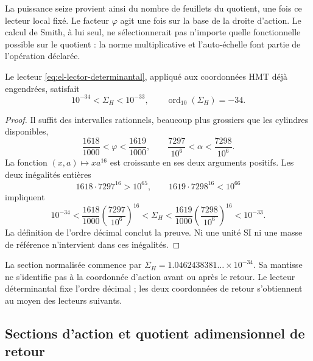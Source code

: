 La puissance seize provient ainsi du nombre de feuillets du quotient, une
fois ce lecteur local fixé. Le facteur \(\varphi\) agit une fois sur
la base de la droite d'action. Le calcul de Smith, à lui seul, ne
sélectionnerait pas n'importe quelle fonctionnelle possible sur le quotient : la norme
multiplicative et l'auto-échelle font partie de l'opération déclarée.

\begin{theorem}
Le lecteur \eqref{eq:el-lector-determinantal}, appliqué aux coordonnées
HMT déjà engendrées, satisfait
\begin{equation}
 10^{-34}<\Sigma_H<10^{-33},\qquad
 \operatorname{ord}_{10}(\Sigma_H)=-34.
 \label{eq:el-decada}
\end{equation}
\end{theorem}
\begin{proof}
\label{md:accion:intervalos}Il suffit des intervalles rationnels, beaucoup plus grossiers que les cylindres
disponibles,
\[
 \frac{1618}{1000}<\varphi<\frac{1619}{1000},\qquad
 \frac{7297}{10^6}<\alpha<\frac{7298}{10^6}.
\]
La fonction \((x,a)\mapsto xa^{16}\) est croissante en ses deux arguments
positifs. Les deux inégalités entières
\[
 1618\cdot7297^{16}>10^{65},\qquad
 1619\cdot7298^{16}<10^{66}
\]
impliquent
\[
 10^{-34}
 <\frac{1618}{1000}\left(\frac{7297}{10^6}\right)^{16}
 <\Sigma_H
 <\frac{1619}{1000}\left(\frac{7298}{10^6}\right)^{16}
 <10^{-33}.
\]
La définition de l'ordre décimal conclut la preuve. Ni une
unité SI ni une masse de référence n'intervient dans ces inégalités.
\end{proof}

La section normalisée commence par
\(\Sigma_H=1.0462438381\ldots\times10^{-34}\). Sa mantisse ne
s'identifie pas à la coordonnée d'action avant ou après le retour.
Le lecteur déterminantal fixe l'ordre décimal ; les deux coordonnées de
retour s'obtiennent au moyen des lecteurs suivants.


\subsection{Sections d'action et quotient adimensionnel de retour}

